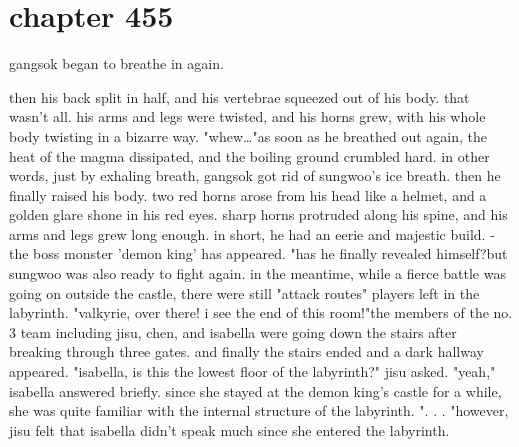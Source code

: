 \section{chapter 455}

gangsok began to breathe in again.





then his back split in half, and his vertebrae squeezed out of his body.
that wasn't all.
 his arms and legs were twisted, and his horns grew, with his whole body twisting in a bizarre way.
"whew…"as soon as he breathed out again, the heat of the magma dissipated, and the boiling ground crumbled hard.
in other words, just by exhaling breath, gangsok got rid of sungwoo's ice breath.
then he finally raised his body.
two red horns arose from his head like a helmet, and a golden glare shone in his red eyes.
 sharp horns protruded along his spine, and his arms and legs grew long enough.
 in short, he had an eerie and majestic build.
- the boss monster 'demon king' has appeared.
"has he finally revealed himself?but sungwoo was also ready to fight again.
in the meantime, while a fierce battle was going on outside the castle, there were still "attack routes" players left in the labyrinth.
"valkyrie, over there! i see the end of this room!"the members of the no.
3 team including jisu, chen, and isabella were going down the stairs after breaking through three gates.
and finally the stairs ended and a dark hallway appeared.
"isabella, is this the lowest floor of the labyrinth?" jisu asked.
"yeah," isabella answered briefly.
since she stayed at the demon king's castle for a while, she was quite familiar with the internal structure of the labyrinth.
".
.
.
"however, jisu felt that isabella didn't speak much since she entered the labyrinth.

